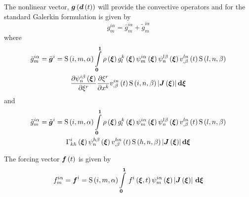 The nonlinear vector, $ \boldsymbol{g}\left(  \boldsymbol{d}\left( t \right)  \right) $ will provide the
convective operators and for the standard Galerkin formulation is given by
\begin{equation}
  g^{i\alpha}_{m}=\bar{g}^{i\alpha}_{m}+\tilde{g}^{i\alpha}_{m}
\end{equation}
where
\begin{multline}
  \bar{g}^{i\alpha}_{m}=\bar{\vectr{g}}^{i}=\idxgsf{i}{m}{\alpha}\dintl{\vectr{0}}{\vectr{1}}\fnof{\rho}{\vectr{\xi}}
    \fnof{g^{k}_{l}}{\vectr{\xi}}\idxgbfn{i}{m}{\alpha}{\vectr{\xi}}\idxgbfn{l}{n}{\beta}{\vectr{\xi}}
    \fnof{\idxnodedof{v}{l}{n}{\beta}}{t}\idxgsf{l}{n}{\beta}\\
    \delby{\idxgbfn{i}{n}{\beta}{\vectr{\xi}}}{\xi^{r}}
    \delby{\xi^{r}}{x^{k}}\fnof{\idxnodedof{v}{i}{n}{\beta}}{t}\idxgsf{i}{n}{\beta}
    \abs{\fnof{\matr{J}}{\vectr{\xi}}}\exteriorderiv{\vectr{\xi}}
\end{multline}
and
\begin{multline}
  \tilde{g}^{i\alpha}_{m}=\tilde{\vectr{g}}^{i}=\idxgsf{i}{m}{\alpha}\dintl{\vectr{0}}{\vectr{1}}\fnof{\rho}{\vectr{\xi}}
    \fnof{g^{k}_{l}}{\vectr{\xi}}\idxgbfn{i}{m}{\alpha}{\vectr{\xi}}\idxgbfn{l}{n}{\beta}{\vectr{\xi}}
    \fnof{\idxnodedof{v}{l}{n}{\beta}}{t}\idxgsf{l}{n}{\beta}\\
    \fnof{\christoffel{i}{k}{h}}{\vectr{\xi}}
    \idxgbfn{h}{n}{\beta}{\vectr{\xi}}\fnof{\idxnodedof{v}{h}{n}{\beta}}{t}\idxgsf{h}{n}{\beta}
    \abs{\fnof{\matr{J}}{\vectr{\xi}}}\exteriorderiv{\vectr{\xi}}
\end{multline}

The forcing vector $ \boldsymbol{f}\left( t \right) $ is given by
\begin{equation}
  f^{i\alpha}_{m}=\vectr{f}^{i}=\idxgsf{i}{m}{\alpha}\gint{\vectr{0}}{\vectr{1}}{\fnof{f^{i}}{\vectr{\xi},t}\idxgbfn{i}{m}{\alpha}{\vectr{\xi}}\abs{\fnof{\matr{J}}{\vectr{\xi}}}}{\vectr{\xi}}
\end{equation}

